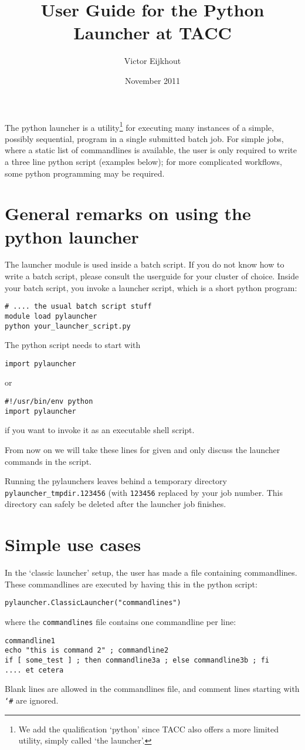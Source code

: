 \documentclass[11pt]{artikel3}
\newcommand\n[1]{{\tt #1}}
\begin{document}
\title{User Guide for the Python Launcher at TACC}
\author{Victor Eijkhout}
\date{November 2011}
\maketitle

The python launcher is a utility\footnote{We add the qualification
  `python' since TACC also offers a more limited utility, simply
  called `the launcher'.} for executing many instances of a
simple, possibly sequential, program in a single submitted batch
job. For simple jobs, where a static list of commandlines is
available, the user is only required to write a three line python
script (examples below); for more complicated workflows, some python
programming may be required.

\section*{General remarks on using the python launcher}

The launcher module is used inside a batch script. If you do not know
how to write a batch script, please consult the userguide for your
cluster of choice. Inside your batch script, you invoke a launcher
script, which is a short python program:
\begin{verbatim}
# .... the usual batch script stuff
module load pylauncher
python your_launcher_script.py
\end{verbatim}
The python script needs to start with
\begin{verbatim}
import pylauncher
\end{verbatim}
or 
\begin{verbatim}
#!/usr/bin/env python
import pylauncher
\end{verbatim}
if you want to invoke it as an executable shell script.

From now on we will take these lines for given and only discuss the
launcher commands in the script.

Running the pylaunchers leaves behind a temporary directory {\tt
  pylauncher\_tmpdir.123456} (with {\tt 123456} replaced by your job
number. This directory can safely be deleted after the launcher job
finishes.

\section*{Simple use cases}

In the `classic launcher' setup, the user has made a file containing
commandlines. These commandlines are executed by having this in the
python script:
\begin{verbatim}
pylauncher.ClassicLauncher("commandlines")
\end{verbatim}
where the \n{commandlines} file contains one commandline per line:
\begin{verbatim}
commandline1
echo "this is command 2" ; commandline2
if [ some_test ] ; then commandline3a ; else commandline3b ; fi
.... et cetera
\end{verbatim}
Blank lines are allowed in the commandlines file, and comment lines
starting with \n{\char`\#} are ignored.
\end{document}
